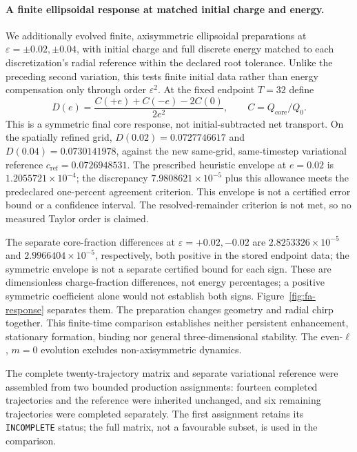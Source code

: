 \paragraph{A finite ellipsoidal response at matched initial charge and energy.}
We additionally evolved finite, axisymmetric ellipsoidal preparations at
$\varepsilon=\pm0.02,\pm0.04$, with initial charge and full discrete energy
matched to each discretization's radial reference within the declared root
tolerance. Unlike the preceding second variation, this tests finite initial
data rather than energy compensation only through order $\varepsilon^2$.
At the fixed endpoint $T=32$ define
\[
 D(e)=\frac{C(+e)+C(-e)-2C(0)}{2e^2},\qquad C=Q_{\mathrm{core}}/Q_0.
\]
This is a symmetric final core response, not initial-subtracted net transport.
On the spatially refined grid,
$D(0.02)=0.0727746617$ and $D(0.04)=0.0730141978$, against the new
same-grid, same-timestep variational reference $c_{\mathrm{ref}}=0.0726948531$.
The prescribed heuristic envelope at $e=0.02$ is $1.2055721\times10^{-4}$;
the discrepancy $7.9808621\times10^{-5}$ plus this allowance meets the
predeclared one-percent agreement criterion. This envelope is not a certified
error bound or a confidence interval. The resolved-remainder criterion is
not met, so no measured Taylor order is claimed.

The separate core-fraction differences at $\varepsilon=+0.02,-0.02$ are
$2.8253326\times10^{-5}$ and $2.9966404\times10^{-5}$, respectively,
both positive in the stored endpoint data; the symmetric envelope is not
a separate certified bound for each sign. These are dimensionless charge-fraction
differences, not energy percentages; a positive symmetric coefficient alone
would not establish both signs. Figure~\ref{fig:fa-response} separates them.
The preparation changes geometry and radial chirp together. This finite-time
comparison establishes neither persistent enhancement, stationary formation,
binding nor general three-dimensional stability. The even-$\ell$, $m=0$
evolution excludes non-axisymmetric dynamics.

The complete twenty-trajectory matrix and separate variational reference
were assembled from two bounded production assignments: fourteen completed
trajectories and the reference were inherited unchanged, and six remaining
trajectories were completed separately. The first assignment retains its
\texttt{INCOMPLETE} status; the full matrix, not a favourable subset,
is used in the comparison.

